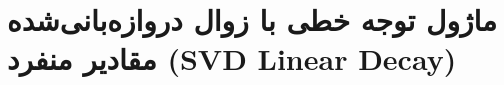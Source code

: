 \section{ماژول توجه خطی با زوال دروازه‌بانی‌شده مقادیر منفرد (SVD Linear Decay)}
\label{sec:module_svd_linear_decay}
